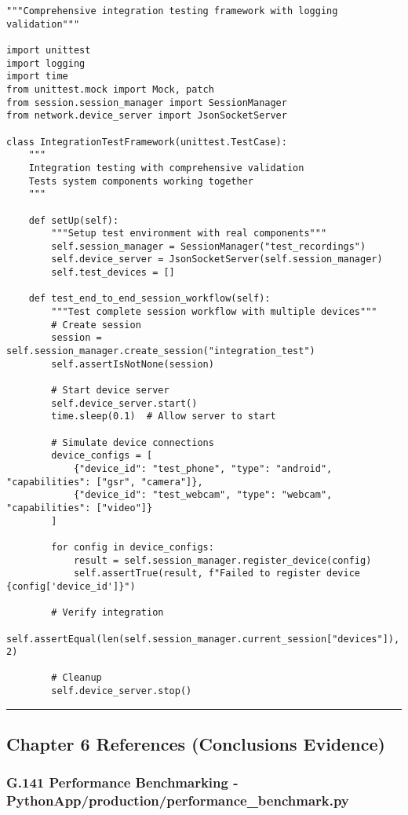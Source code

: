 \documentclass[11pt,a4paper]{article}
\begin{document}
\begin{verbatim}
"""Comprehensive integration testing framework with logging validation"""

import unittest
import logging
import time
from unittest.mock import Mock, patch
from session.session_manager import SessionManager
from network.device_server import JsonSocketServer

class IntegrationTestFramework(unittest.TestCase):
    """
    Integration testing with comprehensive validation
    Tests system components working together
    """

    def setUp(self):
        """Setup test environment with real components"""
        self.session_manager = SessionManager("test_recordings")
        self.device_server = JsonSocketServer(self.session_manager)
        self.test_devices = []

    def test_end_to_end_session_workflow(self):
        """Test complete session workflow with multiple devices"""
        # Create session
        session = self.session_manager.create_session("integration_test")
        self.assertIsNotNone(session)

        # Start device server
        self.device_server.start()
        time.sleep(0.1)  # Allow server to start

        # Simulate device connections
        device_configs = [
            {"device_id": "test_phone", "type": "android", "capabilities": ["gsr", "camera"]},
            {"device_id": "test_webcam", "type": "webcam", "capabilities": ["video"]}
        ]

        for config in device_configs:
            result = self.session_manager.register_device(config)
            self.assertTrue(result, f"Failed to register device {config['device_id']}")

        # Verify integration
        self.assertEqual(len(self.session_manager.current_session["devices"]), 2)

        # Cleanup
        self.device_server.stop()
\end{verbatim}

\hrule

\subsection{Chapter 6 References (Conclusions Evidence)}

\subsubsection{G.141 Performance Benchmarking - PythonApp/production/performance_benchmark.py}
\end{document}
